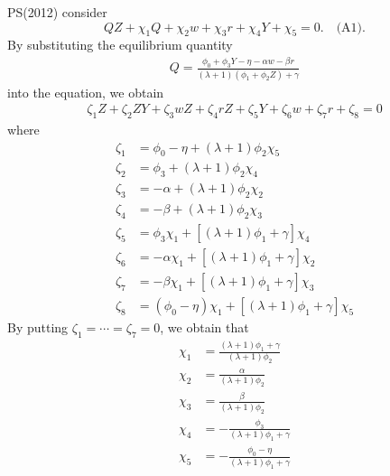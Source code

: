 \documentclass[11pt, a4paper]{article}
\begin{document}
PS(2012) consider
\[QZ + \chi_1 Q + \chi_2 w + \chi_3 r + \chi_4 Y + \chi_5 = 0.\quad \text{(A1)}.\]
By substituting the equilibrium quantity
\begin{align*}
    Q = \frac{\phi_0 + \phi_3Y -\eta - \alpha w -  \beta r}{(\lambda + 1) (\phi_1 + \phi_2 Z) + \gamma}
\end{align*}
into the equation, we obtain
\begin{align}
    \zeta_1 Z + \zeta_2 ZY + \zeta_3 wZ + \zeta_4 rZ + \zeta_5 Y + \zeta_6 w + \zeta_7 r + \zeta_8 = 0 
\end{align}
where
\begin{align*}
    \zeta_1 &= \phi_0 - \eta + (\lambda + 1)\phi_2\chi_5\\
    \zeta_2 &= \phi_3 + (\lambda + 1)\phi_2 \chi_4\\
    \zeta_3 &= - \alpha +(\lambda + 1)\phi_2\chi_2\\
    \zeta_4 &= -\beta + (\lambda + 1)\phi_2\chi_3\\
    \zeta_5 &= \phi_3\chi_1 + [(\lambda + 1)\phi_1 + \gamma]\chi_4\\
    \zeta_6 &= - \alpha\chi_1 +[(\lambda + 1)\phi_1 + \gamma]\chi_2\\
    \zeta_7 &= - \beta\chi_1 +[(\lambda + 1)\phi_1 + \gamma]\chi_3\\
    \zeta_8 &= (\phi_0 -\eta)\chi_1+ [(\lambda + 1)\phi_1 + \gamma]\chi_5
\end{align*}
By putting $\zeta_1 = \cdots = \zeta_7 =0$, we obtain that
\begin{align*}
        \chi_1 &= \frac{(\lambda + 1)\phi_1 + \gamma}{(\lambda + 1)\phi_2}\\
        \chi_2 &= \frac{\alpha}{(\lambda + 1)\phi_2}\\
        \chi_3 &= \frac{\beta}{(\lambda + 1)\phi_2}\\
        \chi_4 &= -\frac{\phi_3}{(\lambda + 1)\phi_1 + \gamma}\\
        \chi_5 &= -\frac{\phi_0 - \eta}{(\lambda + 1)\phi_1 + \gamma}
\end{align*}
\end{document}
